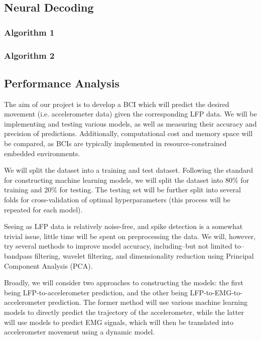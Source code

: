 \documentclass[12pt]{article}
\begin{document}
\subsection{Neural Decoding}

\subsubsection{Algorithm 1}

\subsubsection{Algorithm 2}

\subsection{Performance Analysis}

The aim of our project is to develop a BCI which will predict the desired movement (i.e. accelerometer data) given the corresponding LFP data. We will be implementing and testing various models, as well as measuring their accuracy and precision of predictions. Additionally, computational cost and memory space will be compared, as BCIs are typically implemented in resource-constrained embedded environments.

We will split the dataset into a training and test dataset. Following the standard for constructing machine learning models, we will split the dataset into 80\% for training and 20\% for testing. The testing set will be further split into several folds for cross-validation of optimal hyperparameters (this process will be repeated for each model).

Seeing as LFP data is relatively noise-free, and spike detection is a somewhat trivial issue, little time will be spent on preprocessing the data. We will, however, try several methods to improve model accuracy, including--but not limited to--bandpass filtering, wavelet filtering, and dimensionality reduction using Principal Component Analysis (PCA).

Broadly, we will consider two approaches to constructing the models: the first being LFP-to-accelerometer prediction, and the other being LFP-to-EMG-to-accelerometer prediction. The former method will use various machine learning models to directly predict the trajectory of the accelerometer, while the latter will use models to predict EMG signals, which will then be translated into accelerometer movement using a dynamic model.
\end{document}
